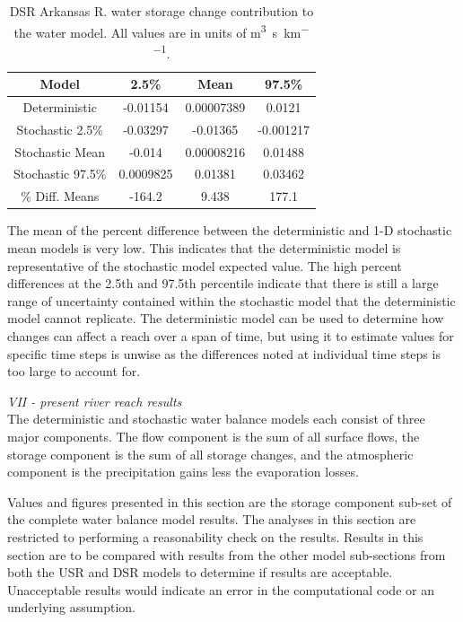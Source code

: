 \begin{linenumbers}
\begin{table}[htbp]
\centering
\caption[DSR Arkansas R. water storage change contribution to the water model.]{DSR Arkansas R. water storage change contribution to the water model.  All values are in units of \si{\cubic\meter\per\second\per\kilo\meter}.}
\label{tab:DSRWaterStore}
\begin{tabular}{c|ccc}
	\toprule
	Model& 2.5\% & Mean & 97.5\% \\
	\midrule
	\midrule
	Deterministic    &	-0.01154&	0.00007389&	0.0121\\
	\midrule                                               
	Stochastic 2.5\% &	-0.03297&	-0.01365&	-0.001217\\
	Stochastic Mean  &	-0.014&	0.00008216&	0.01488\\      
	Stochastic 97.5\%&	0.0009825&	0.01381&	0.03462\\  
	\midrule                                               
	\% Diff. Means&		-164.2&	9.438&	177.1\\
	\bottomrule
\end{tabular}
\end{table}

The mean of the percent difference between the deterministic and 1-D stochastic mean models is very low.  This indicates that the deterministic model is representative of the stochastic model expected value.  The high percent differences at the 2.5th and 97.5th percentile indicate that there is still a large range of uncertainty contained within the stochastic model that the deterministic model cannot replicate.  The deterministic model can be used to determine how changes can affect a reach over a span of time, but using it to estimate values for specific time steps is unwise as the differences noted at individual time steps is too large to account for.

\emph{VII - present river reach results}\\

The deterministic and stochastic water balance models each consist of three major components.  The flow component is the sum of all surface flows, the storage component is the sum of all storage changes, and the atmospheric component is the precipitation gains less the evaporation losses.

Values and figures presented in this section are the storage component sub-set of the complete water balance model results.  The analyses in this section are restricted to performing a reasonability check on the results.  Results in this section are to be compared with results from the other model sub-sections from both the USR and DSR models to determine if results are acceptable.  Unacceptable results would indicate an error in the computational code or an underlying assumption.


\end{linenumbers}
